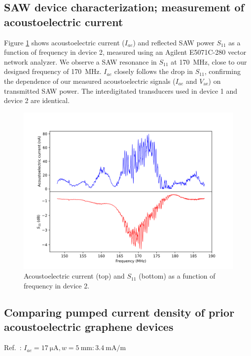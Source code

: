 \documentclass[double,12pt,1in,seploa]{beavtex}
\let\Oldsubsection\subsection
\renewcommand{\subsection}{\FloatBarrier\Oldsubsection}
\begin{document}
\subsection{SAW device characterization; measurement of acoustoelectric current} 
Figure \ref{AECP Figure S3} shows acoustoelectric current ($I_{ae}$) and reflected SAW power $S_{11}$ as a function of frequency in device 2, measured using an Agilent E5071C-280 vector network analyzer. We observe a SAW resonance in $S_{11}$ at \SI{170}{\mega\hertz}, close to our designed frequency of \SI{170}{\mega\hertz}.  $I_{ae}$ closely follows the drop in $S_{11}$, confirming the dependence of our measured acoustoelectric signals ($I_{ae}$ and $V_{\mathrm{ae}}$) on transmitted SAW power. The interdigitated transducers used in device 1 and device 2 are identical.

\begin{figure}
    \includegraphics[width = 1\textwidth]{Figure S3, AEC vs S11.png}
    \caption{Acoustoelectric current (top) and $S_{11}$ (bottom) as a function of frequency in device 2.}
    \label{AECP Figure S3}
\end{figure}

\subsection{Comparing pumped current density of prior acoustoelectric graphene devices}

Ref.\ \cite{okuda_graphene_2018}: $I_{ae} = \SI{17}{\micro \ampere}, w = \SI{5}{\milli\meter}: \SI{3.4}{\milli \ampere/\meter}$
\end{document}
